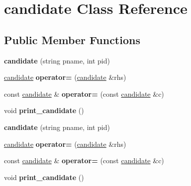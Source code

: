 \hypertarget{classcandidate}{\section{candidate Class Reference}
\label{classcandidate}
}
\subsection*{Public Member Functions}
\begin{DoxyCompactItemize}
\item 
\hypertarget{classcandidate_acdc5859c6303e8b1eaa65d0154887c65}{{\bfseries candidate} (string pname, int pid)}\label{classcandidate_acdc5859c6303e8b1eaa65d0154887c65}

\item 
\hypertarget{classcandidate_a1af1730b4f2e6a3b1947bbd1c5e5c094}{\hyperlink{classcandidate}{candidate} {\bfseries operator=} (\hyperlink{classcandidate}{candidate} \&rhs)}\label{classcandidate_a1af1730b4f2e6a3b1947bbd1c5e5c094}

\item 
\hypertarget{classcandidate_a436ceedf485a23d3c88edbac10fd8f65}{const \hyperlink{classcandidate}{candidate} \& {\bfseries operator=} (const \hyperlink{classcandidate}{candidate} \&c)}\label{classcandidate_a436ceedf485a23d3c88edbac10fd8f65}

\item 
\hypertarget{classcandidate_a2e3fe36070679f88542cc1cbc4a1a1bd}{void {\bfseries print\-\_\-candidate} ()}\label{classcandidate_a2e3fe36070679f88542cc1cbc4a1a1bd}

\item 
\hypertarget{classcandidate_acdc5859c6303e8b1eaa65d0154887c65}{{\bfseries candidate} (string pname, int pid)}\label{classcandidate_acdc5859c6303e8b1eaa65d0154887c65}

\item 
\hypertarget{classcandidate_a1af1730b4f2e6a3b1947bbd1c5e5c094}{\hyperlink{classcandidate}{candidate} {\bfseries operator=} (\hyperlink{classcandidate}{candidate} \&rhs)}\label{classcandidate_a1af1730b4f2e6a3b1947bbd1c5e5c094}

\item 
\hypertarget{classcandidate_a436ceedf485a23d3c88edbac10fd8f65}{const \hyperlink{classcandidate}{candidate} \& {\bfseries operator=} (const \hyperlink{classcandidate}{candidate} \&c)}\label{classcandidate_a436ceedf485a23d3c88edbac10fd8f65}

\item 
\hypertarget{classcandidate_a2e3fe36070679f88542cc1cbc4a1a1bd}{void {\bfseries print\-\_\-candidate} ()}\label{classcandidate_a2e3fe36070679f88542cc1cbc4a1a1bd}

\end{DoxyCompactItemize}
